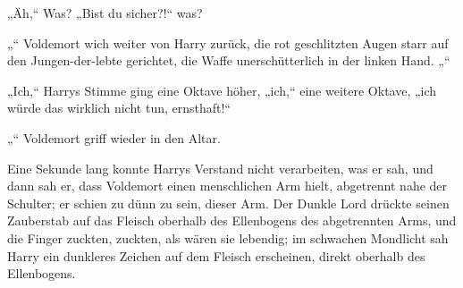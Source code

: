 „Äh,“ Was? „Bist du sicher?!“ was?

„“
Voldemort wich weiter von Harry zurück, die rot geschlitzten Augen starr auf den Jungen-der-lebte gerichtet, die Waffe unerschütterlich in der linken Hand.
„“

„Ich,“ Harrys Stimme ging eine Oktave höher,
„ich,“ eine weitere Oktave, „ich würde das wirklich nicht tun, ernsthaft!“

„“
Voldemort griff wieder in den Altar.

Eine Sekunde lang konnte Harrys Verstand nicht verarbeiten, was er sah, und dann sah er, dass Voldemort einen menschlichen Arm hielt, abgetrennt nahe der Schulter; er schien zu dünn zu sein, dieser Arm.
Der Dunkle Lord drückte seinen Zauberstab auf das Fleisch oberhalb des Ellenbogens des abgetrennten Arms, und die Finger zuckten, zuckten, als wären sie lebendig; im schwachen Mondlicht sah Harry ein dunkleres Zeichen auf dem Fleisch erscheinen, direkt oberhalb des Ellenbogens.


